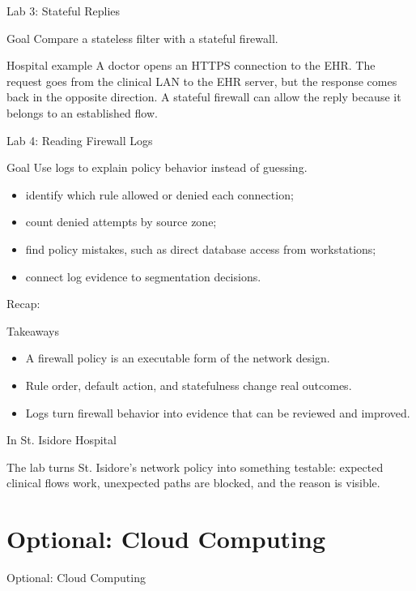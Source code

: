 \documentclass[presentation]{beamer}
\newcommand{\sectiontitleframe}[1]{
\begin{frame}[plain,c]
\begin{center}
{\usebeamerfont{title}\usebeamercolor[fg]{title}#1}
\end{center}
\end{frame}
}
\newcommand{\scenario}{St. Isidore Hospital}
\newcommand{\takeawaysframe}[2]{
\begin{frame}[c]{Recap: \insertsection}
\begin{block}{Takeaways}
#1
\end{block}
\begin{exampleblock}{In \scenario}
#2
\end{exampleblock}
\end{frame}
}
\begin{document}
\begin{frame}[c]{Lab 3: Stateful Replies}
\begin{block}{Goal}
Compare a stateless filter with a stateful firewall.
\end{block}

\begin{exampleblock}{Hospital example}
A doctor opens an HTTPS connection to the EHR. The request goes from the clinical LAN to the EHR
server, but the response comes back in the opposite direction. A stateful firewall can allow the
reply because it belongs to an established flow.
\end{exampleblock}
\end{frame}

\begin{frame}[c]{Lab 4: Reading Firewall Logs}
\begin{block}{Goal}
Use logs to explain policy behavior instead of guessing.
\end{block}

\begin{itemize}
    \item identify which rule allowed or denied each connection;
    \item count denied attempts by source zone;
    \item find policy mistakes, such as direct database access from workstations;
    \item connect log evidence to segmentation decisions.
\end{itemize}
\end{frame}

\takeawaysframe{
\begin{itemize}
    \item A firewall policy is an executable form of the network design.
    \item Rule order, default action, and statefulness change real outcomes.
    \item Logs turn firewall behavior into evidence that can be reviewed and improved.
\end{itemize}
}{
The lab turns St. Isidore's network policy into something testable: expected clinical flows work,
unexpected paths are blocked, and the reason is visible.
}

\section{Optional: Cloud Computing}
\sectiontitleframe{Optional: Cloud Computing}
\end{document}
